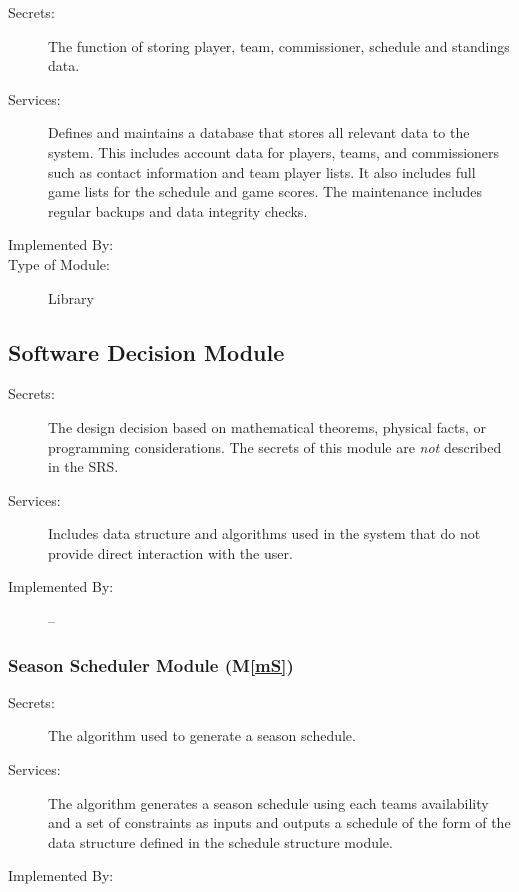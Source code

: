 \documentclass[12pt, titlepage]{article}
\newcommand{\mref}[1]{M\ref{#1}}
\begin{document}
\begin{description}
  \item[Secrets:]The function of storing player, team, commissioner, schedule
  and standings data.
  \item[Services:]Defines and maintains a database that stores all relevant data
  to the \progname{} system. This includes account data for players, teams, and
  commissioners such as contact information and team player lists. It also
  includes full game lists for the schedule and game scores. The maintenance
  includes regular backups and data integrity checks.
  \item[Implemented By:] \progname{}
  \item[Type of Module:] Library
\end{description}


\subsection{Software Decision Module}

\begin{description}
  \item[Secrets:] The design decision based on mathematical theorems, physical
  facts, or programming considerations. The secrets of this module are
  \emph{not} described in the SRS.
  \item[Services:] Includes data structure and algorithms used in the system that
  do not provide direct interaction with the user. 
  \item[Implemented By:] --
\end{description}

\subsubsection{Season Scheduler Module (\mref{mS})}

\begin{description}
  \item[Secrets:]The algorithm used to generate a season schedule.
  \item[Services:]The algorithm generates a season schedule using each teams
  availability and a set of constraints as inputs and outputs a schedule of
  the form of the data structure defined in the schedule structure module.
  \item[Implemented By:] \progname{}
\end{description}
\end{document}
